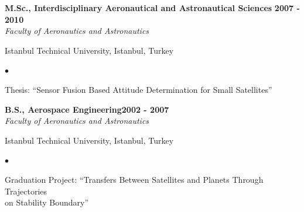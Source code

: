 \documentclass[margin,line]{res}
\newenvironment{list1}{
  \begin{list}{\ding{113}}{
      \setlength{\itemsep}{0in}
      \setlength{\parsep}{0in} \setlength{\parskip}{0in}
      \setlength{\topsep}{0in} \setlength{\partopsep}{0in}
      \setlength{\leftmargin}{0.17in}}}{\end{list}}
\newenvironment{list2}{
  \begin{list}{$\bullet$}{
      \setlength{\itemsep}{0in}
      \setlength{\parsep}{0in} \setlength{\parskip}{0in}
      \setlength{\topsep}{0in} \setlength{\partopsep}{0in}
      \setlength{\leftmargin}{0.2in}}}{\end{list}}
\begin{document}
\begin{resume}
{\bf M.Sc., Interdisciplinary Aeronautical and Astronautical Sciences}  \hfill {\bf  2007 - 2010}\\
{\em Faculty of Aeronautics and Astronautics}
\vspace*{.1in}
\begin{list1}
\item[] Istanbul Technical University, Istanbul, Turkey
\begin{list2}
\vspace*{.05in}
\item Thesis:  ``Sensor Fusion Based Attitude Determination for Small Satellites''
\end{list2}
\end{list1}

{\bf B.S., Aerospace Engineering}\hfill {\bf 2002 - 2007}\\
{\em Faculty of Aeronautics and Astronautics}
\vspace*{.1in}
\begin{list1}
\item[] Istanbul Technical University, Istanbul, Turkey 
\begin{list2}
\vspace*{.05in}
\item Graduation Project: ``Transfers Between Satellites and Planets Through Trajectories \\ \hspace*{1.23in} on Stability Boundary'' 
\end{list2}
\end{list1}



\end{resume}
\end{document}
